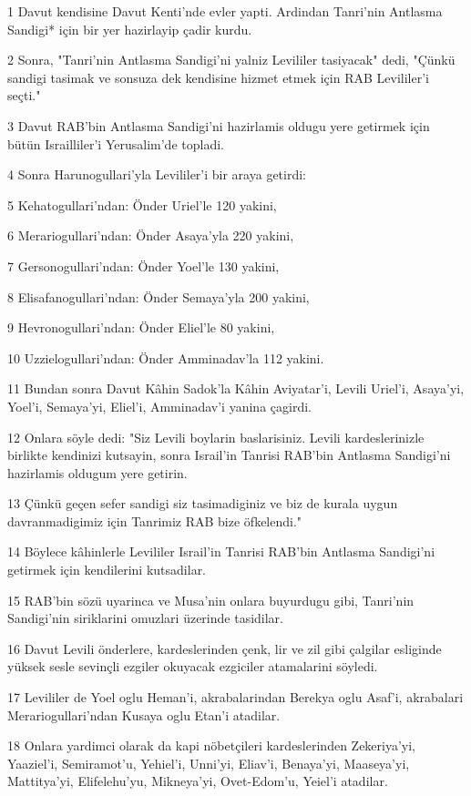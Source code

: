 \par 1 Davut kendisine Davut Kenti'nde evler yapti. Ardindan Tanri'nin Antlasma Sandigi* için bir yer hazirlayip çadir kurdu.
\par 2 Sonra, "Tanri'nin Antlasma Sandigi'ni yalniz Levililer tasiyacak" dedi, "Çünkü sandigi tasimak ve sonsuza dek kendisine hizmet etmek için RAB Levililer'i seçti."
\par 3 Davut RAB'bin Antlasma Sandigi'ni hazirlamis oldugu yere getirmek için bütün Israilliler'i Yerusalim'de topladi.
\par 4 Sonra Harunogullari'yla Levililer'i bir araya getirdi:
\par 5 Kehatogullari'ndan: Önder Uriel'le 120 yakini,
\par 6 Merariogullari'ndan: Önder Asaya'yla 220 yakini,
\par 7 Gersonogullari'ndan: Önder Yoel'le 130 yakini,
\par 8 Elisafanogullari'ndan: Önder Semaya'yla 200 yakini,
\par 9 Hevronogullari'ndan: Önder Eliel'le 80 yakini,
\par 10 Uzzielogullari'ndan: Önder Amminadav'la 112 yakini.
\par 11 Bundan sonra Davut Kâhin Sadok'la Kâhin Aviyatar'i, Levili Uriel'i, Asaya'yi, Yoel'i, Semaya'yi, Eliel'i, Amminadav'i yanina çagirdi.
\par 12 Onlara söyle dedi: "Siz Levili boylarin baslarisiniz. Levili kardeslerinizle birlikte kendinizi kutsayin, sonra Israil'in Tanrisi RAB'bin Antlasma Sandigi'ni hazirlamis oldugum yere getirin.
\par 13 Çünkü geçen sefer sandigi siz tasimadiginiz ve biz de kurala uygun davranmadigimiz için Tanrimiz RAB bize öfkelendi."
\par 14 Böylece kâhinlerle Levililer Israil'in Tanrisi RAB'bin Antlasma Sandigi'ni getirmek için kendilerini kutsadilar.
\par 15 RAB'bin sözü uyarinca ve Musa'nin onlara buyurdugu gibi, Tanri'nin Sandigi'nin siriklarini omuzlari üzerinde tasidilar.
\par 16 Davut Levili önderlere, kardeslerinden çenk, lir ve zil gibi çalgilar esliginde yüksek sesle sevinçli ezgiler okuyacak ezgiciler atamalarini söyledi.
\par 17 Levililer de Yoel oglu Heman'i, akrabalarindan Berekya oglu Asaf'i, akrabalari Merariogullari'ndan Kusaya oglu Etan'i atadilar.
\par 18 Onlara yardimci olarak da kapi nöbetçileri kardeslerinden Zekeriya'yi, Yaaziel'i, Semiramot'u, Yehiel'i, Unni'yi, Eliav'i, Benaya'yi, Maaseya'yi, Mattitya'yi, Elifelehu'yu, Mikneya'yi, Ovet-Edom'u, Yeiel'i atadilar.
